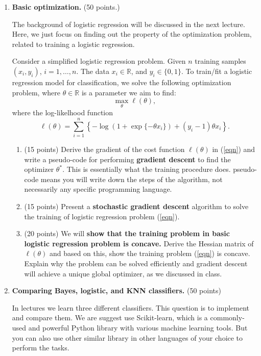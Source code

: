 \documentclass[twoside,10pt]{article}
\begin{document}
\begin{enumerate}

\item {\bf Basic optimization.} (50 points.)

The background of logistic regression will be discussed in the next lecture. Here, we just focus on finding out the property of the optimization problem, related to training a logistic regression. 

Consider a simplified logistic regression problem. 
Given $n$ training samples $(x_i, y_i)$, $i = 1, \ldots, n$. The data $x_i \in \mathbb R$, and $y_i \in \{0, 1\}$.  To train/fit a logistic regression model for classification, we solve the following optimization problem, where $\theta \in \mathbb R$ is a parameter we aim to find:
\begin{equation}
\max_\theta \ell (\theta), \label{eqn}
\end{equation}
where the log-likelhood function \[\ell(\theta) = \sum_{i=1}^n \left\{-\log (1+\exp\{-\theta x_i\}) + (y_i-1) \theta x_i\right\}.\]

\begin{enumerate}
\item (15 points) Derive the gradient of the cost function $\ell(\theta)$ in (\ref{eqn}) and write a pseudo-code for performing {\bf gradient descent} to find the optimizer $\theta^*$. This is essentially what the training procedure does. pseudo-code  means you will write down the steps of the algorithm, not necessarily any specific programming language. 
\item (15 points) Present a {\bf stochastic gradient descent} algorithm to solve the training of logistic regression problem (\ref{eqn}). 
\item (20 points) We will {\bf show that the training problem in basic logistic regression problem is concave.} Derive the Hessian matrix of $\ell(\theta)$ and based on this, show the training problem (\ref{eqn}) is concave. Explain why the problem can be solved efficiently and gradient descent will achieve a unique global optimizer, as we discussed in class. 

\end{enumerate}
 
\item {\bf Comparing Bayes, logistic, and KNN classifiers.} (50 points)

In lectures we learn three different classifiers. This question is to implement and compare them. We are suggest use \textsf{Scikit-learn}, which is a commonly-used and powerful \textsf{Python} library with various machine learning tools. But you can also use other similar library in other languages of your choice to perform the tasks. 




\end{enumerate}
\end{document}
